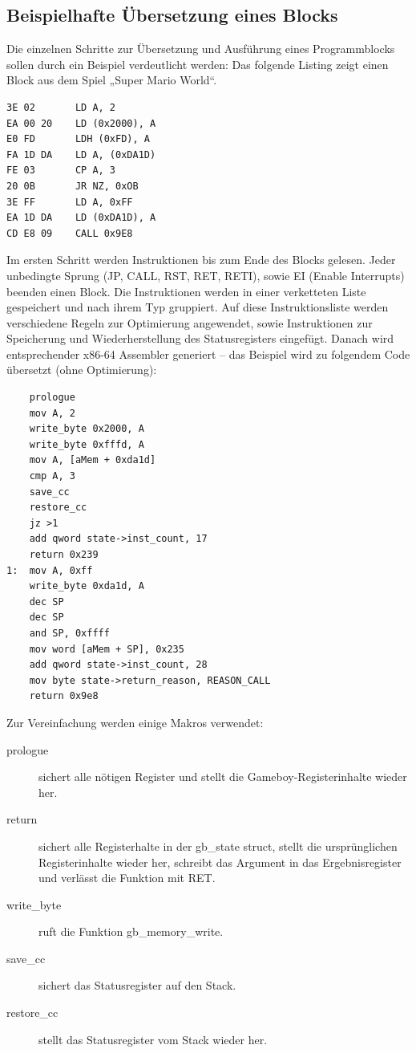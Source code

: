 \documentclass[a4paper]{scrartcl}
\begin{document}
\subsection{Beispielhafte Übersetzung eines Blocks}

Die einzelnen Schritte zur Übersetzung und Ausführung eines Programmblocks sollen durch ein Beispiel verdeutlicht werden: Das folgende Listing zeigt einen Block aus dem Spiel „Super Mario World“.

\begin{lstlisting}
3E 02		LD A, 2
EA 00 20	LD (0x2000), A
E0 FD		LDH (0xFD), A
FA 1D DA	LD A, (0xDA1D)
FE 03		CP A, 3
20 0B		JR NZ, 0xOB
3E FF		LD A, 0xFF
EA 1D DA	LD (0xDA1D), A
CD E8 09	CALL 0x9E8
\end{lstlisting}

Im ersten Schritt werden Instruktionen bis zum Ende des Blocks gelesen. Jeder unbedingte Sprung (JP, CALL, RST, RET, RETI), sowie EI (Enable Interrupts) beenden einen Block. Die Instruktionen werden in einer verketteten Liste gespeichert und nach ihrem Typ gruppiert. Auf diese Instruktionsliste werden verschiedene Regeln zur Optimierung angewendet, sowie Instruktionen zur Speicherung und Wiederherstellung des Statusregisters eingefügt. Danach wird entsprechender x86-64 Assembler generiert -- das Beispiel wird zu folgendem Code übersetzt (ohne Optimierung):

\begin{lstlisting}
	prologue
	mov A, 2
	write_byte 0x2000, A
	write_byte 0xfffd, A
	mov A, [aMem + 0xda1d]
	cmp A, 3
	save_cc
	restore_cc
	jz >1
	add qword state->inst_count, 17
	return 0x239
1:	mov A, 0xff
	write_byte 0xda1d, A
	dec SP
	dec SP
	and SP, 0xffff
	mov word [aMem + SP], 0x235
	add qword state->inst_count, 28
	mov byte state->return_reason, REASON_CALL
	return 0x9e8
\end{lstlisting}

Zur Vereinfachung werden einige Makros verwendet:
\begin{description}
\item[prologue]
sichert alle nötigen Register und stellt die Gameboy-Registerinhalte wieder her.
\item[return]
sichert alle Registerhalte in der gb\_state struct, stellt die ursprünglichen Registerinhalte wieder her, schreibt das Argument in das Ergebnisregister und verlässt die Funktion mit RET.
\item[write\_byte]
ruft die Funktion gb\_memory\_write.
\item[save\_cc]
sichert das Statusregister auf den Stack.
\item[restore\_cc]
stellt das Statusregister vom Stack wieder her.
\end{description}
\end{document}
